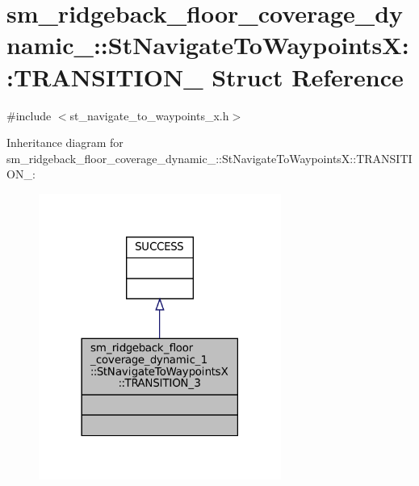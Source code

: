 \hypertarget{structsm__ridgeback__floor__coverage__dynamic__1_1_1StNavigateToWaypointsX_1_1TRANSITION__3}{}\section{sm\+\_\+ridgeback\+\_\+floor\+\_\+coverage\+\_\+dynamic\+\_\+:\+:St\+Navigate\+To\+WaypointsX\+:\+:T\+R\+A\+N\+S\+I\+T\+I\+O\+N\+\_ Struct Reference}
\label{structsm__ridgeback__floor__coverage__dynamic__1_1_1StNavigateToWaypointsX_1_1TRANSITION__3}


{\ttfamily \#include $<$st\+\_\+navigate\+\_\+to\+\_\+waypoints\+\_\+x.\+h$>$}



Inheritance diagram for sm\+\_\+ridgeback\+\_\+floor\+\_\+coverage\+\_\+dynamic\+\_\+:\+:St\+Navigate\+To\+WaypointsX\+:\+:T\+R\+A\+N\+S\+I\+T\+I\+O\+N\+\_\+:
\nopagebreak
\begin{figure}[H]
\begin{center}
\leavevmode
\includegraphics[width=225pt]{structsm__ridgeback__floor__coverage__dynamic__1_1_1StNavigateToWaypointsX_1_1TRANSITION__3__inherit__graph}
\end{center}
\end{figure}


